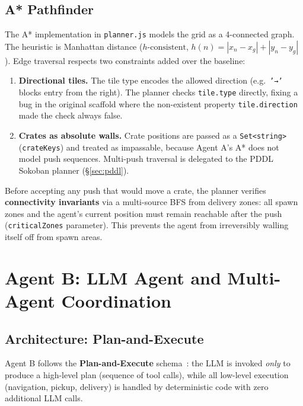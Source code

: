 \documentclass[10pt,a4paper,twocolumn]{article}
\begin{document}
\subsection{A* Pathfinder}

The A* implementation in \texttt{planner.js} models the grid as a
4-connected graph.  The heuristic is Manhattan distance ($h\text{-consistent}$,
$h(n) = |x_n - x_g| + |y_n - y_g|$).  Edge traversal respects two constraints
added over the baseline:
\begin{enumerate}[noitemsep]
  \item \textbf{Directional tiles.}  The tile type encodes the allowed
        direction (e.g.\ \texttt{'→'} blocks entry from the right).  The planner
        checks \texttt{tile.type} directly, fixing a bug in the original scaffold
        where the non-existent property \texttt{tile.direction} made the check
        always false.
  \item \textbf{Crates as absolute walls.}  Crate positions are passed as a
        \texttt{Set<string>} (\texttt{crateKeys}) and treated as impassable,
        because Agent A's A* does not model push sequences.  Multi-push
        traversal is delegated to the PDDL Sokoban planner (§\ref{sec:pddl}).
\end{enumerate}

\noindent Before accepting any push that would move a crate, the planner verifies
\textbf{connectivity invariants} via a multi-source BFS from delivery zones:
all spawn zones and the agent's current position must remain reachable after the
push (\texttt{criticalZones} parameter).  This prevents the agent from
irreversibly walling itself off from spawn areas.

\section{Agent B: LLM Agent and Multi-Agent Coordination}
\label{sec:llm}

\subsection{Architecture: Plan-and-Execute}

Agent B follows the \textbf{Plan-and-Execute} schema~\cite{yao2023}: the LLM
is invoked \emph{only} to produce a high-level plan (sequence of tool calls),
while all low-level execution (navigation, pickup, delivery) is handled by
deterministic code with zero additional LLM calls.
\end{document}
